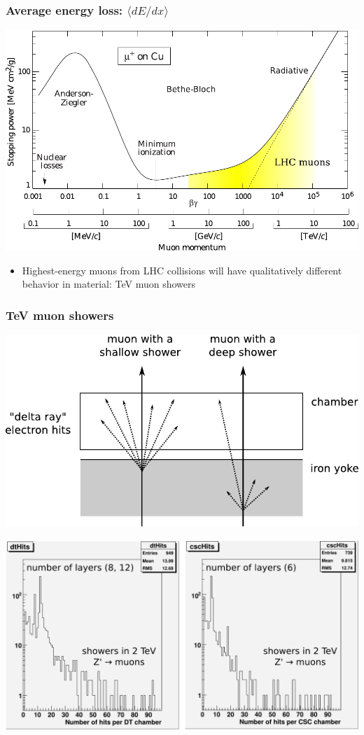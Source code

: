 \documentclass[compress]{beamer}
\begin{document}
\begin{frame}
\frametitle{Average energy loss: $\langle dE/dx \rangle$}

\vspace{0.5 cm}
\includegraphics[width=0.95\linewidth]{pdg_muonsthroughmatter_simplified.pdf}

\begin{itemize}
\item Highest-energy muons from LHC collisions will have qualitatively different behavior in material: TeV muon showers
\end{itemize}
\end{frame}

\begin{frame}
\frametitle{TeV muon showers}

\includegraphics[width=0.65\linewidth]{showers.pdf}

\hfill \includegraphics[width=0.75\linewidth]{hits_in_showers.pdf}
\end{frame}
\end{document}
